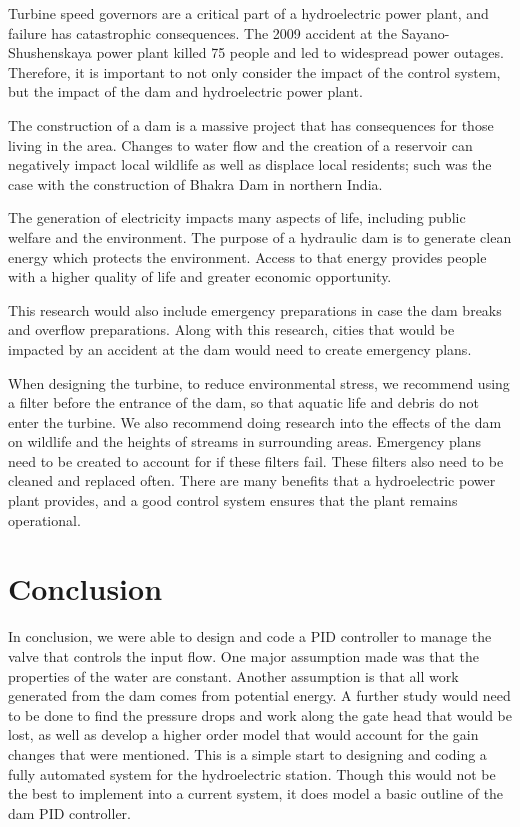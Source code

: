 \documentclass{article}
\begin{document}
\begin{multicols*}{2}
        Turbine speed governors are a critical part of a hydroelectric power plant, and failure has catastrophic consequences. The 2009 accident at the Sayano-Shushenskaya power plant killed 75 people and led to widespread power outages. Therefore, it is important to not only consider the impact of the control system, but the impact of the dam and hydroelectric power plant.

        The construction of a dam is a massive project that has consequences for those living in the area. Changes to water flow and the creation of a reservoir can negatively impact local wildlife as well as displace local residents; such was the case with the construction of Bhakra Dam in northern India. 

        The generation of electricity impacts many aspects of life, including public welfare and the environment. The purpose of a hydraulic dam is to generate clean energy which protects the environment. Access to that energy provides people with a higher quality of life and greater economic opportunity.

        This research would also include emergency preparations in case the dam breaks and overflow preparations. Along with this research, cities that would be impacted by an accident at the dam would need to create emergency plans.

        When designing the turbine, to reduce environmental stress, we recommend using a filter before the entrance of the dam, so that aquatic life and debris do not enter the turbine. We also recommend doing research into the effects of the dam on wildlife and the heights of streams in surrounding areas. Emergency plans need to be created to account for if these filters fail. These filters also need to be cleaned and replaced often.
        There are many benefits that a hydroelectric power plant provides, and a good control system ensures that the plant remains operational.

        \section{Conclusion}

        In conclusion, we were able to design and code a PID controller to manage the valve that controls the input flow.  One major assumption made was that the properties of the water are constant.  Another assumption is that all work generated from the dam comes from potential energy.  A further study would need to be done to find the pressure drops and work along the gate head that would be lost, as well as develop a higher order model that would account for the gain changes that were mentioned. This is a simple start to designing and coding a fully automated system for the hydroelectric station.  Though this would not be the best to implement into a current system, it does model a basic outline of the dam PID controller. 


    \end{multicols*}
\end{document}

